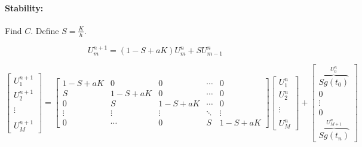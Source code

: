 \documentclass[a4paper, 10pt]{article}
\begin{document}
\paragraph{Stability:}
Find \(C\). Define \( S = \frac{K}{h} \).

\[
    U_m^{n+1} = (1 - S + aK)U_m^n + SU_{m-1}^n
\]

\[
    \begin{bmatrix}
        U_1^{n+1} \\
        U_2^{n+1} \\
        \\
        \vdots    \\
        \\
        U_M^{n+1}
    \end{bmatrix}
    =
    \begin{bmatrix}
        1 - S + aK & 0          & 0          & \cdots & 0          \\
        S          & 1 - S + aK & 0          & \cdots & 0          \\
        0          & S          & 1 - S + aK & \cdots & 0          \\
        \vdots     & \vdots     & \vdots     & \ddots & \vdots     \\
        0          & \cdots     & 0          & S      & 1 - S + aK
    \end{bmatrix}
    \begin{bmatrix}
        U_1^n  \\
        U_2^n  \\
        \\
        \vdots \\
        \\
        U_M^n
    \end{bmatrix}
    +
    \begin{bmatrix}
        \overbrace{S g(t_0)}^{U_0^n} \\
        0                            \\
        \vdots                       \\
        0                            \\
        \overbrace{S g(t_n)}^{U_{M+1}^n}
    \end{bmatrix}
\]
\end{document}
